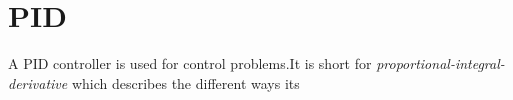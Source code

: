 \chapter{PID}
\label{chp:pid}
A PID controller is used for control problems.It is short for \emph{proportional-integral-derivative} which describes the different ways its 


\citep{feedbackSystem}